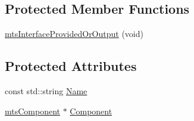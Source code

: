 \subsection*{Protected Member Functions}
\begin{DoxyCompactItemize}
\item 
\hyperlink{classmts_interface_provided_or_output_adda05ae483aaa5fa04186aaa33245f27}{mts\-Interface\-Provided\-Or\-Output} (void)
\end{DoxyCompactItemize}
\subsection*{Protected Attributes}
\begin{DoxyCompactItemize}
\item 
const std\-::string \hyperlink{classmts_interface_provided_or_output_a8d81ba3320cfe66ab35d892cbc3b36cb}{Name}
\item 
\hyperlink{classmts_component}{mts\-Component} $\ast$ \hyperlink{classmts_interface_provided_or_output_ac4f9f610b6910375301a7f0dfa1ec826}{Component}
\end{DoxyCompactItemize}


